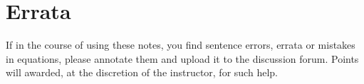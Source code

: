 %

\section{Errata}

If in the course of using these notes, you find sentence errors, errata or mistakes in equations, please annotate them and upload it to the discussion forum. Points will awarded, at the discretion of the instructor, for such help.